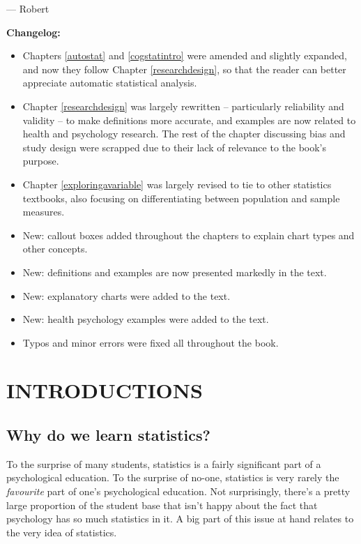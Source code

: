 \documentclass[
  11pt,
]{book}
\providecommand{\tightlist}{%
  \setlength{\itemsep}{0pt}\setlength{\parskip}{0pt}}
\theoremstyle{definition}
\theoremstyle{definition}
\theoremstyle{definition}
\theoremstyle{definition}
\theoremstyle{remark}
\begin{document}
\nopagebreak[4]

--- Robert

\textbf{Changelog:}

\begin{itemize}
\tightlist
\item
  Chapters \ref{autostat} and \ref{cogstatintro} were amended and slightly expanded, and now they follow Chapter \ref{researchdesign}, so that the reader can better appreciate automatic statistical analysis.
\item
  Chapter \ref{researchdesign} was largely rewritten -- particularly reliability and validity -- to make definitions more accurate, and examples are now related to health and psychology research. The rest of the chapter discussing bias and study design were scrapped due to their lack of relevance to the book's purpose.
\item
  Chapter \ref{exploringavariable} was largely revised to tie to other statistics textbooks, also focusing on differentiating between population and sample measures.
\item
  New: callout boxes added throughout the chapters to explain chart types and other concepts.
\item
  New: definitions and examples are now presented markedly in the text.
\item
  New: explanatory charts were added to the text.
\item
  New: health psychology examples were added to the text.
\item
  Typos and minor errors were fixed all throughout the book.
\end{itemize}

\hypertarget{part-introductions}{%
\part*{INTRODUCTIONS}\label{part-introductions}}

\hypertarget{whywhywhy}{%
\chapter{Why do we learn statistics?}\label{whywhywhy}}

To the surprise of many students, statistics is a fairly significant part of a psychological education. To the surprise of no-one, statistics is very rarely the \emph{favourite} part of one's psychological education. Not surprisingly, there's a pretty large proportion of the student base that isn't happy about the fact that psychology has so much statistics in it. A big part of this issue at hand relates to the very idea of statistics.
\end{document}

